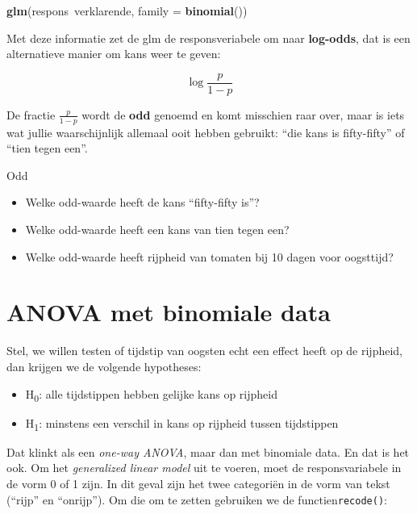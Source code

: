 \documentclass[]{book}
\newenvironment{Shaded}{\begin{snugshade}}{\end{snugshade}}
\newcommand{\KeywordTok}[1]{\textcolor[rgb]{0.13,0.29,0.53}{\textbf{{#1}}}}
\newcommand{\DataTypeTok}[1]{\textcolor[rgb]{0.13,0.29,0.53}{{#1}}}
\newcommand{\NormalTok}[1]{{#1}}
\providecommand{\tightlist}{%
  \setlength{\itemsep}{0pt}\setlength{\parskip}{0pt}}
\theoremstyle{definition}
\theoremstyle{definition}
\theoremstyle{definition}
\theoremstyle{remark}
\let\BeginKnitrBlock\begin \let\EndKnitrBlock\end
\begin{document}
\begin{Shaded}
\begin{Highlighting}[]
\KeywordTok{glm}\NormalTok{(respons~verklarende, }\DataTypeTok{family =} \KeywordTok{binomial}\NormalTok{())}
\end{Highlighting}
\end{Shaded}

Met deze informatie zet de glm de responsveriabele om naar
\textbf{log-odds}, dat is een alternatieve manier om kans weer te geven:

\[\log{\frac{p}{1-p}}\]

De fractie \(\frac{p}{1-p}\) wordt de \textbf{odd} genoemd en komt
misschien raar over, maar is iets wat jullie waarschijnlijk allemaal
ooit hebben gebruikt: ``die kans is fifty-fifty'' of ``tien tegen een''.

\BeginKnitrBlock{exercise}
\protect\hypertarget{exr:unnamed-chunk-5}{}{\label{exr:unnamed-chunk-5} }Odd

\begin{itemize}
\tightlist
\item
  Welke odd-waarde heeft de kans ``fifty-fifty is''?
\item
  Welke odd-waarde heeft een kans van tien tegen een?
\item
  Welke odd-waarde heeft rijpheid van tomaten bij 10 dagen voor
  oogsttijd?
\end{itemize}
\EndKnitrBlock{exercise}

\section{ANOVA met binomiale data}\label{anova-met-binomiale-data}

Stel, we willen testen of tijdstip van oogsten echt een effect heeft op
de rijpheid, dan krijgen we de volgende hypotheses:

\begin{itemize}
\tightlist
\item
  H\textsubscript{0}: alle tijdstippen hebben gelijke kans op rijpheid
\item
  H\textsubscript{1}: minstens een verschil in kans op rijpheid tussen
  tijdstippen
\end{itemize}

Dat klinkt als een \emph{one-way ANOVA}, maar dan met binomiale data. En
dat is het ook. Om het \emph{generalized linear model} uit te voeren,
moet de responsvariabele in de vorm 0 of 1 zijn. In dit geval zijn het
twee categoriën in de vorm van tekst (``rijp'' en ``onrijp''). Om die om
te zetten gebruiken we de functien\texttt{recode()}:
\end{document}
